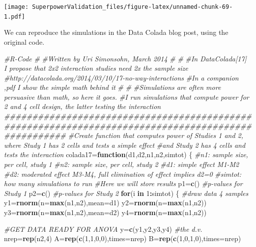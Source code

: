 \documentclass[]{book}
\newenvironment{Shaded}{\begin{snugshade}}{\end{snugshade}}
\newcommand{\CommentTok}[1]{\textcolor[rgb]{0.56,0.35,0.01}{\textit{#1}}}
\newcommand{\ControlFlowTok}[1]{\textcolor[rgb]{0.13,0.29,0.53}{\textbf{#1}}}
\newcommand{\DataTypeTok}[1]{\textcolor[rgb]{0.13,0.29,0.53}{#1}}
\newcommand{\DecValTok}[1]{\textcolor[rgb]{0.00,0.00,0.81}{#1}}
\newcommand{\KeywordTok}[1]{\textcolor[rgb]{0.13,0.29,0.53}{\textbf{#1}}}
\newcommand{\NormalTok}[1]{#1}
\newcommand{\OperatorTok}[1]{\textcolor[rgb]{0.81,0.36,0.00}{\textbf{#1}}}
\begin{document}
\texttt{[image: SuperpowerValidation\_files/figure-latex/unnamed-chunk-69-1.pdf]}

We can reproduce the simulations in the Data Colada blog post, using the original code.

\begin{Shaded}
\begin{Highlighting}[]
\CommentTok{#R-Code}
\CommentTok{#}
\CommentTok{#Written by Uri Simonsohn, March 2014}
\CommentTok{#}
\CommentTok{#}
\CommentTok{#In DataColada[17] I propose that 2x2 interaction studies need 2x the sample size}
\CommentTok{#http://datacolada.org/2014/03/10/17-no-way-interactions}
\CommentTok{#In a companion ,pdf I show the simple math behind it}
\CommentTok{#}
\CommentTok{#}
\CommentTok{#Simulations are often more persuasive than math, so here it goes.}
\CommentTok{#I run simulations that compute power for 2 and 4 cell design, the latter testing the interaction}
\CommentTok{###################################################################################################}
\CommentTok{#Create function that computes power of Studies 1 and 2, where Study 1  has 2 cells and tests a simple effect}
\CommentTok{#and Study 2 has 4 cells and tests the interaction}
\NormalTok{  colada17=}\ControlFlowTok{function}\NormalTok{(d1,d2,n1,n2,simtot)}
\NormalTok{  \{}
  \CommentTok{#n1: sample size, per cell, study 1}
  \CommentTok{#n2: sample size, per cell, study 2}
  \CommentTok{#d1: simple effect M1-M2}
  \CommentTok{#d2: moderated effect M3-M4, full elimination of effect implies d2=0}
  \CommentTok{#simtot: how many simulations to run}
  \CommentTok{#Here we will store results}
\NormalTok{      p1=}\KeywordTok{c}\NormalTok{()    }\CommentTok{#p-values for Study 1}
\NormalTok{      p2=}\KeywordTok{c}\NormalTok{()    }\CommentTok{#p-values for Study 2}
  \ControlFlowTok{for}\NormalTok{(i }\ControlFlowTok{in} \DecValTok{1}\OperatorTok{:}\NormalTok{simtot) \{}
    \CommentTok{#draw data 4 samples}
\NormalTok{    y1=}\KeywordTok{rnorm}\NormalTok{(}\DataTypeTok{n=}\KeywordTok{max}\NormalTok{(n1,n2),}\DataTypeTok{mean=}\NormalTok{d1)}
\NormalTok{    y2=}\KeywordTok{rnorm}\NormalTok{(}\DataTypeTok{n=}\KeywordTok{max}\NormalTok{(n1,n2))}
\NormalTok{    y3=}\KeywordTok{rnorm}\NormalTok{(}\DataTypeTok{n=}\KeywordTok{max}\NormalTok{(n1,n2),}\DataTypeTok{mean=}\NormalTok{d2)}
\NormalTok{    y4=}\KeywordTok{rnorm}\NormalTok{(}\DataTypeTok{n=}\KeywordTok{max}\NormalTok{(n1,n2))}
    
    \CommentTok{#GET DATA READY FOR ANOVA  }
\NormalTok{      y=}\KeywordTok{c}\NormalTok{(y1,y2,y3,y4)          }\CommentTok{#the d.v.}
\NormalTok{      nrep=}\KeywordTok{rep}\NormalTok{(n2,}\DecValTok{4}\NormalTok{)          }
\NormalTok{      A=}\KeywordTok{rep}\NormalTok{(}\KeywordTok{c}\NormalTok{(}\DecValTok{1}\NormalTok{,}\DecValTok{1}\NormalTok{,}\DecValTok{0}\NormalTok{,}\DecValTok{0}\NormalTok{),}\DataTypeTok{times=}\NormalTok{nrep) }
\NormalTok{      B=}\KeywordTok{rep}\NormalTok{(}\KeywordTok{c}\NormalTok{(}\DecValTok{1}\NormalTok{,}\DecValTok{0}\NormalTok{,}\DecValTok{1}\NormalTok{,}\DecValTok{0}\NormalTok{),}\DataTypeTok{times=}\NormalTok{nrep)}
    

\end{Highlighting}
\end{Shaded}
\end{document}
